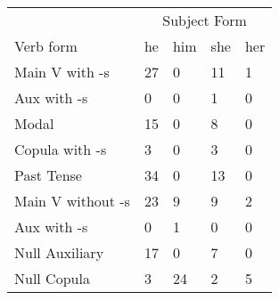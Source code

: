 \begin{table}[]
\begin{minipage}{0.5\textwidth}
\end{minipage}
\begin{minipage}{0.5\textwidth}
\centering
{}
    \begin{tabular}{@{}lllll@{}}
        \toprule
            &\multicolumn{4}{c}{Subject Form}\\
            \cline{2-5}
        Verb form & he & him & she & her \\
        \midrule
        Main V with -s & 27 & 0 & 11 & 1 \\
        Aux with -s & 0 & 0 & 1 & 0 \\
        Modal & 15 & 0 & 8 & 0 \\
        Copula with -s & 3 & 0 & 3 & 0 \\
        Past Tense & 34 & 0 & 13 & 0 \\
        \hline
        Main V without -s & 23 & 9 & 9 & 2 \\
        Aux with -s & 0 & 1 & 0 & 0 \\
        Null Auxiliary & 17 & 0 & 7 & 0 \\
        Null Copula & 3 & 24 & 2 & 5 \\
        \bottomrule
    \end{tabular}
\end{minipage}
\end{table}

